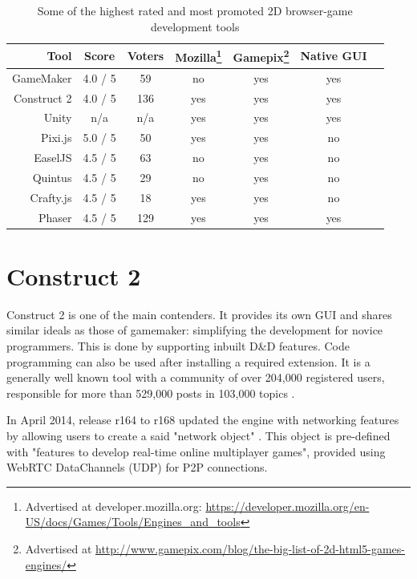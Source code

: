 \documentclass[bsc,frontabs,twoside,singlespacing,parskip,deptreport]{infthesis}     %
\begin{document}
\begin{savenotes}
\begin{table}[H]
\centering
  \begin{tabular}{ | r || c | c | c | c | c | c | }
  	\hline
  	\textbf{Tool}			& \textbf{Score}		& \textbf{Voters}& \textbf{Mozilla}\footnote{Advertised at developer.mozilla.org: \url{https://developer.mozilla.org/en-US/docs/Games/Tools/Engines\_and\_tools}} 	& \textbf{Gamepix}\footnote{Advertised at \url{http://www.gamepix.com/blog/the-big-list-of-2d-html5-games-engines/}} 	& \textbf{Native GUI}\\ \hline\hline
	GameMaker		& 4.0 / 5	& 59	& no	& yes	& yes	\\ \hline
    Construct 2		& 4.0 / 5	& 136	& yes	& yes	& yes	\\ \hline    
    Unity			& n/a		& n/a	& yes	& yes	& yes	\\ \hline
    Pixi.js			& 5.0 / 5	& 50	& yes	& yes	& no	\\ \hline
    EaselJS			& 4.5 / 5	& 63	& no	& yes	& no	\\ \hline
    Quintus			& 4.5 / 5	& 29	& no	& yes	& no	\\ \hline
    Crafty.js		& 4.5 / 5	& 18	& yes	& yes	& no	\\ \hline
    Phaser			& 4.5 / 5	& 129	& yes	& yes	& yes	\\ \hline
  \end{tabular}
  \caption{Some of the highest rated and most promoted 2D browser-game development tools}
  \label{table:Related_Tools}
\end{table}%
\end{savenotes}

\section{Construct 2}
Construct 2 is one of the main contenders. It provides its own GUI and shares similar ideals as those of gamemaker: simplifying the development for novice programmers. This is done by supporting inbuilt D\&D features. Code programming can also be used after installing a required extension. It is a generally well known tool with a community of over 204,000 registered users, responsible for more than 529,000 posts in 103,000 topics \cite{scirra_forum}.

In April 2014, release r164 to r168 updated the engine with networking features by allowing users to create a said "network object" \cite{construct2_multiplayer}. This object is pre-defined with "features to develop real-time online multiplayer games", provided using WebRTC DataChannels (UDP) for P2P connections. 
\end{document}

